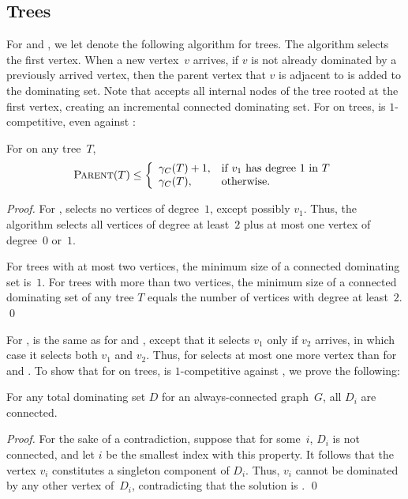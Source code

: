 \subsection{Trees}

For \ds and \cds, we let \aparent denote the following algorithm for trees.  The
algorithm selects the first vertex.  When a new vertex~$v$ arrives,
if $v$ is not already dominated by a previously arrived vertex,
then the parent vertex that $v$ is adjacent to is added to the
dominating set.
Note that \aparent accepts all internal nodes of the tree rooted
at the first vertex, creating an incremental connected dominating set.
For \cds on trees, \aparent is $1$-competitive,
even against \offopt:

\begin{lemma}
\label{lemma:cds-trees-alg}
For \cds on any tree~$T$, 
$$
\operatorname{\textsc{Parent}}(T) \leq \left\{ 
\begin{array}{ll} 
\gamma_C(T) + 1, & \text{if } v_1 \text{ has degree $1$ in } T \\
\gamma_C(T), & \text{otherwise}.
\end{array}
\right.
$$
\end{lemma}
\begin{proof}
For \cds, \aparent selects no vertices of degree~$1$, except possibly $v_1$.
Thus, the algorithm selects all vertices of degree at least~$2$ plus at most one
vertex of degree~$0$ or~$1$.

For trees with at most two vertices, the minimum size of a connected dominating
set is~$1$.
For trees with more than two vertices, the minimum size of a
connected dominating set of any tree $T$ equals the number of vertices
with degree at least~$2$.
\qed\end{proof}

For \tds, \aparent is the same as for \ds and \cds, except that it 
 selects $v_1$ only if $v_2$ arrives, in which case it selects both $v_1$ and $v_2$.
Thus, \aparent for \tds selects at most one more vertex than \aparent
for \ds and \cds.
To show that for \tds on trees,
\aparent is $1$-competitive against \onopt,
we prove the following:

\begin{lemma}
\label{lemma:tds-is-connected}
For any \incr total dominating set $D$ for an always\--con\-nect\-ed graph~$G$,
all $D_i$ are connected.
\end{lemma}
\begin{proof}
For the sake of a contradiction, suppose that for some~$i$, 
$D_i$ is not connected, and let
$i$ be the smallest index with this property. It follows that the vertex
$v_i$ constitutes a singleton component of 
$D_i$. Thus, $v_i$ cannot be dominated by any other vertex of~$D_i$,
contradicting that the solution is \incr.
\qed\end{proof}

